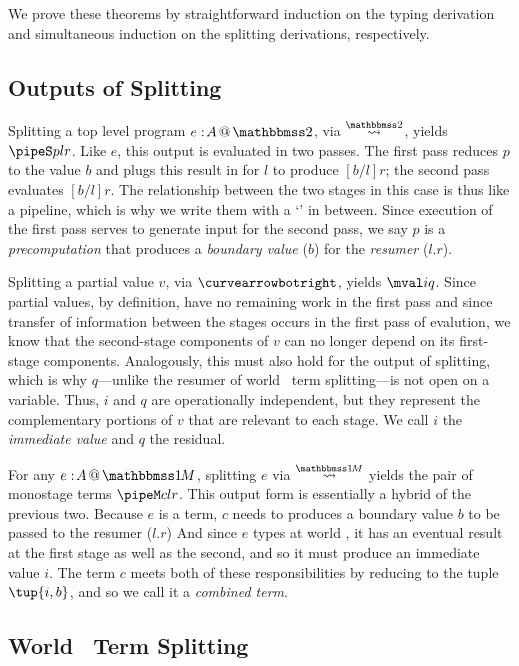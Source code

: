 \begin{abstrsyn}
We prove these theorems by straightforward induction on the typing derivation
and simultaneous induction on the splitting derivations, respectively.

\subsection{Outputs of Splitting}

Splitting a top level program $\coltwo e A$, via $\splittwosym$, yields $\pipeS p l r$.
Like $e$, this output is evaluated in two passes.
The first pass reduces $p$ to the value $b$ and plugs this result in for $l$ to produce $[b/l]r$;
the second pass evaluates $[b/l]r$.
The relationship between the two stages in this case is thus like a pipeline,
which is why we write them with a `\mytt{|}' in between.
Since execution of the first pass serves to generate input for
the second pass, we say $p$ is a {\em precomputation} that produces a
{\em boundary value} ($b$) for the {\em resumer} ($l.r$).

Splitting a partial value $v$, via $\vsplito$, yields $\mval i q$.
Since partial values, by definition, have no remaining work in the first pass
and since transfer of information between the stages occurs in the first pass of evalution,
we know that the second-stage components of $v$ can no longer depend on its first-stage components.
Analogously, this must also hold for the output of splitting, 
which is why $q$---unlike the resumer of world \bbtwo\ term splitting---is not open on a variable.
Thus, $i$ and $q$ are operationally independent, but they represent the complementary portions of $v$ that are relevant to each stage.
We call $i$ the \emph{immediate value} and $q$ the residual.

For any $\colmix e A$, splitting $e$ via $\splitonesym$ yields the pair of monostage terms $\pipeM c l r$. 
This output form is essentially a hybrid of the previous two.
Because $e$ is a term, $c$ needs to produces a boundary value $b$ to be passed to the resumer ($l.r$)
And since $e$ types at world \bbonem, it has an eventual result at the 
first stage as well as the second, and so it must produce an immediate value $i$.
The term $c$ meets both of these responsibilities by reducing to the tuple $\tup{i,b}$,
and so we call it a \emph{combined term}.

\subsection{World \bbtwo\ Term Splitting}


\end{abstrsyn}
